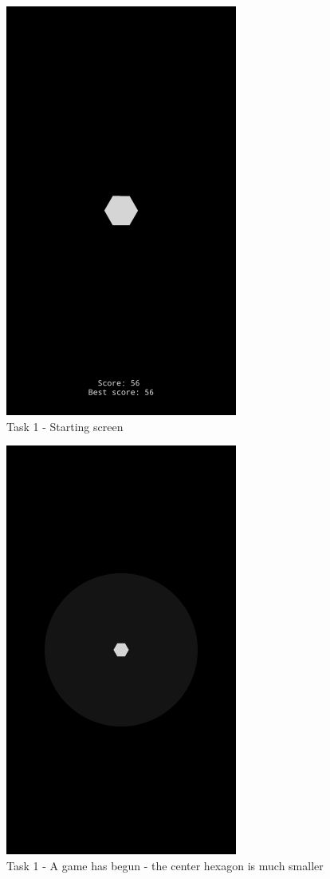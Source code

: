 \documentclass{article}
\begin{document}
	\begin{figure}[ht]
		\includegraphics[width=3in]{img/t1s1.png}
		\centering
		\caption{Task 1 - Starting screen}
	\end{figure}
	\begin{figure}[ht]
		\includegraphics[width=3in]{img/t1s2.png}
		\centering
		\caption{Task 1 - A game has begun - the center hexagon is much smaller}
	\end{figure}
\end{document}
